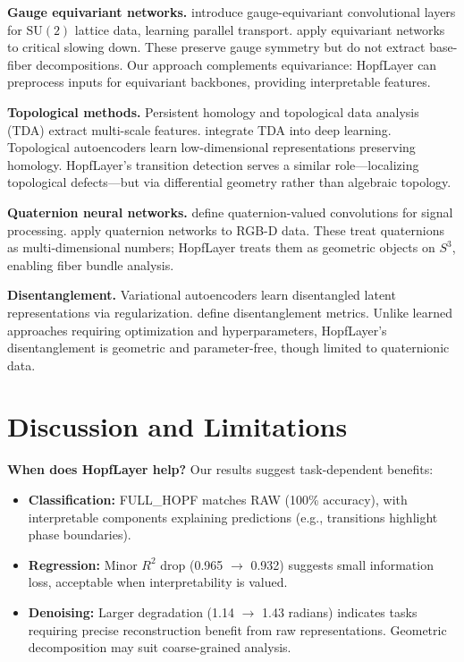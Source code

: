 \documentclass[10pt,twocolumn]{article}
\newcommand{\SU}{\mathrm{SU}}
\begin{document}
\textbf{Gauge equivariant networks.} \citet{favoni2022lattice} introduce gauge-equivariant convolutional layers for $\SU(2)$ lattice data, learning parallel transport. \citet{boyda2021applications} apply equivariant networks to critical slowing down. These preserve gauge symmetry but do not extract base-fiber decompositions. Our approach complements equivariance: HopfLayer can preprocess inputs for equivariant backbones, providing interpretable features.

\textbf{Topological methods.} Persistent homology \citep{carlsson2009topology} and topological data analysis (TDA) extract multi-scale features. \citet{hofer2017deep} integrate TDA into deep learning. Topological autoencoders \citep{moor2020topological} learn low-dimensional representations preserving homology. HopfLayer's transition detection serves a similar role—localizing topological defects—but via differential geometry rather than algebraic topology.

\textbf{Quaternion neural networks.} \citet{parcollet2019quaternion} define quaternion-valued convolutions for signal processing. \citet{gaudet2018deep} apply quaternion networks to RGB-D data. These treat quaternions as multi-dimensional numbers; HopfLayer treats them as geometric objects on $S^3$, enabling fiber bundle analysis.

\textbf{Disentanglement.} Variational autoencoders \citep{higgins2017beta,locatello2019challenging} learn disentangled latent representations via regularization. \citet{eastwood2018framework} define disentanglement metrics. Unlike learned approaches requiring optimization and hyperparameters, HopfLayer's disentanglement is geometric and parameter-free, though limited to quaternionic data.

\FloatBarrier
\section{Discussion and Limitations}

\textbf{When does HopfLayer help?} Our results suggest task-dependent benefits:
\begin{itemize}
\item \textbf{Classification:} FULL\_HOPF matches RAW (100\% accuracy), with interpretable components explaining predictions (e.g., transitions highlight phase boundaries).
\item \textbf{Regression:} Minor $R^2$ drop (0.965 $\to$ 0.932) suggests small information loss, acceptable when interpretability is valued.
\item \textbf{Denoising:} Larger degradation (1.14 $\to$ 1.43 radians) indicates tasks requiring precise reconstruction benefit from raw representations. Geometric decomposition may suit coarse-grained analysis.
\end{itemize}
\end{document}
